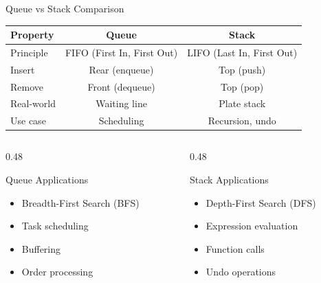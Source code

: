 \documentclass[aspectratio=169,xcolor=dvipsnames]{beamer}
\begin{document}
\begin{frame}{Queue vs Stack Comparison}
  \begin{center}
    \begin{tabular}{l|c|c}
      \toprule
      \textbf{Property} & \textbf{Queue} & \textbf{Stack} \\
      \midrule
      Principle & FIFO (First In, First Out) & LIFO (Last In, First Out) \\
      Insert & Rear (enqueue) & Top (push) \\
      Remove & Front (dequeue) & Top (pop) \\
      Real-world & Waiting line & Plate stack \\
      Use case & Scheduling & Recursion, undo \\
      \bottomrule
    \end{tabular}
  \end{center}

  \vspace{0.5cm}

  \begin{columns}
    \begin{column}{0.48\textwidth}
      \begin{block}{Queue Applications}
        \begin{itemize}
          \item Breadth-First Search (BFS)
          \item Task scheduling
          \item Buffering
          \item Order processing
        \end{itemize}
      \end{block}
    \end{column}
    \begin{column}{0.48\textwidth}
      \begin{block}{Stack Applications}
        \begin{itemize}
          \item Depth-First Search (DFS)
          \item Expression evaluation
          \item Function calls
          \item Undo operations
        \end{itemize}
      \end{block}
    \end{column}
  \end{columns}
\end{frame}
\end{document}
